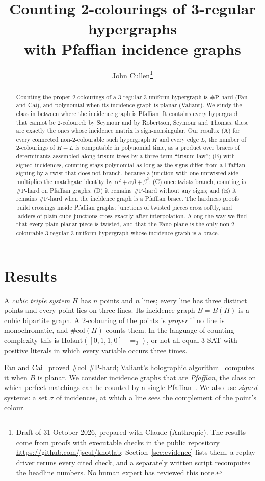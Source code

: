 \documentclass[11pt]{article}
\title{Counting 2-colourings of 3-regular hypergraphs\\ with Pfaffian incidence graphs}
\author{John Cullen\thanks{Draft of 31 October 2026, prepared with Claude
(Anthropic). The results come from proofs with executable checks in the
public repository \url{https://github.com/jscul/knotlab}; Section~\ref{sec:evidence} lists them, a replay
driver reruns every cited check, and a separately written script recomputes
the headline numbers. No human expert has reviewed this note.}}
\date{}
\theoremstyle{definition}
\theoremstyle{remark}
\newcommand{\sharpP}{\#\mathrm{P}}
\newcommand{\col}{\#\mathrm{col}}
\begin{document}
\maketitle

\begin{abstract}
Counting the proper 2-colourings of a 3-regular 3-uniform hypergraph is
$\sharpP$-hard (Fan and Cai), and polynomial when its incidence graph is
planar (Valiant). We study the class in between where the incidence graph is
Pfaffian. It contains every hypergraph that cannot be 2-coloured: by Seymour
and by Robertson, Seymour and Thomas, these are exactly the ones whose
incidence matrix is sign-nonsingular. Our results:
(A) for every connected non-2-colourable such hypergraph $H$ and every edge
$L$, the number of 2-colourings of $H-L$ is computable in polynomial time, as
a product over braces of determinants assembled along trisum trees by a
three-term ``trisum law''; (B) with signed incidences, counting stays
polynomial as long as the signs differ from a Pfaffian signing by a twist that
does not branch, because a junction with one untwisted side multiplies the
matchgate identity by $\alpha^2+\alpha\beta+\beta^2$; (C) once twists branch,
counting is $\sharpP$-hard on Pfaffian graphs; (D) it remains $\sharpP$-hard
without any signs; and (E) it remains $\sharpP$-hard when the incidence graph
is a Pfaffian brace. The hardness proofs build crossings inside Pfaffian
graphs: junctions of twisted pieces cross softly, and ladders of plain cube
junctions cross exactly after interpolation. Along the way we find that every
plain planar piece is twisted, and that the Fano plane is the only
non-2-colourable 3-regular 3-uniform hypergraph whose incidence graph is a
brace.
\end{abstract}

\section{Results}\label{sec:results}

A \emph{cubic triple system} $H$ has $n$ points and $n$ lines; every line has
three distinct points and every point lies on three lines. Its incidence graph
$B=B(H)$ is a cubic bipartite graph. A 2-colouring of the points is
\emph{proper} if no line is monochromatic, and $\col(H)$ counts them. In the
language of counting complexity this is $\mathrm{Holant}([0,1,1,0]\mid{=}_3)$,
or not-all-equal 3-SAT with positive literals in which every variable occurs
three times.

Fan and Cai~\cite{FC20} proved $\col$ $\sharpP$-hard; Valiant's holographic
algorithm~\cite{Val08} computes it when $B$ is planar. We consider incidence
graphs that are \emph{Pfaffian}, the class on which perfect matchings can be
counted by a single Pfaffian~\cite{Kas63,Lit75,RST99,McC04}. We also use
\emph{signed} systems: a set $\sigma$ of incidences, at which a line sees the
complement of the point's colour.
\end{document}
